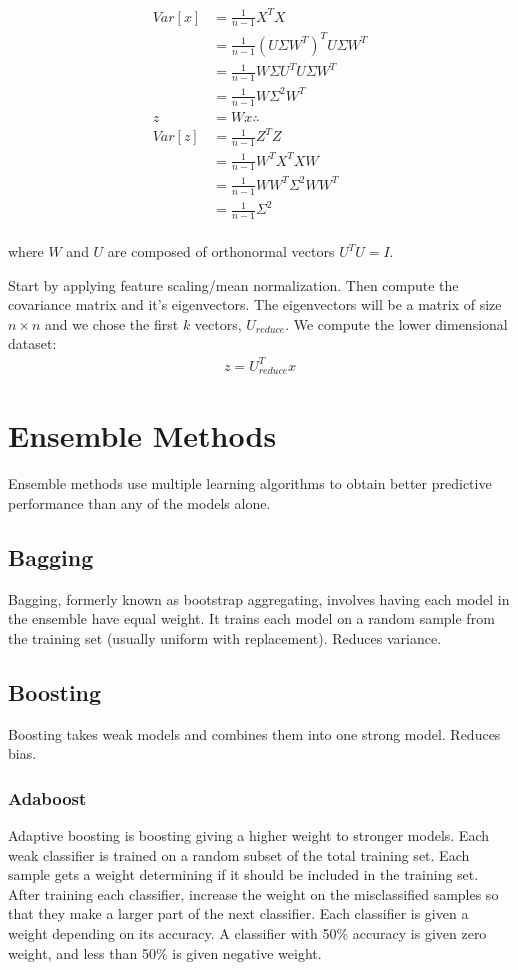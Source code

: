 \documentclass[12pt]{article}
\begin{document}
\begin{align*}
Var[x] & = \frac{1}{n-1}X^TX \\
& =  \frac{1}{n-1}(U\Sigma W^T)^TU\Sigma W^T \\
& =  \frac{1}{n-1}W\Sigma U^TU\Sigma W^T \\
& =  \frac{1}{n-1}W\Sigma^2 W^T \\
z &= Wx\therefore \\
Var[z] &= \frac{1}{n-1}Z^TZ \\
& = \frac{1}{n-1}W^TX^TXW \\
& = \frac{1}{n-1}WW^T\Sigma^2WW^T \\
& = \frac{1}{n-1}\Sigma^2 \\
\end{align*}

where $W$ and $U$ are composed of orthonormal vectors $U^TU=I$.  

Start by applying feature scaling/mean normalization. Then compute the covariance matrix and it's eigenvectors. The eigenvectors will be a matrix of size $n\times n$ and we chose the first $k$ vectors, $U_{reduce}$. We compute the lower dimensional dataset:
\begin{align*}
z = U_{reduce}^Tx
\end{align*}

	
\section{Ensemble Methods}
Ensemble methods use multiple learning algorithms to obtain better predictive performance than any of the models alone.

\subsection{Bagging}
Bagging, formerly known as bootstrap aggregating, involves having each model in the ensemble have equal weight. It trains each model on a random sample from the training set (usually uniform with replacement). Reduces variance.

\subsection{Boosting}
Boosting takes weak models and combines them into one strong model. Reduces bias.
\subsubsection{Adaboost}
Adaptive boosting is boosting giving a higher weight to stronger models. Each weak classifier is trained on a random subset of the total training set. Each sample gets a weight determining if it should be included in the training set. After training each classifier, increase the weight on the misclassified samples so that they make a larger part of the next classifier. Each classifier is given a weight depending on its accuracy. A classifier with 50\% accuracy is given zero weight, and less than 50\% is given negative weight.
\end{document}

